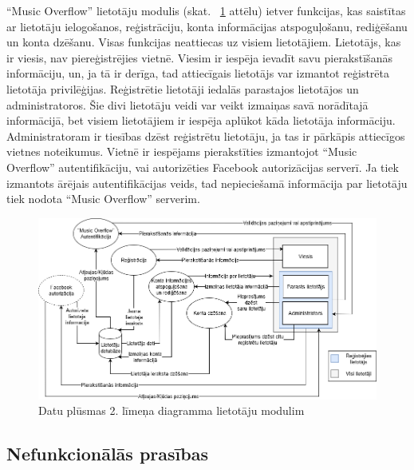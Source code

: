 \documentclass[12pt]{article}
\begin{document}
``Music Overflow'' lietotāju modulis (skat. ~\ref{fig:dpd_2_3} attēlu) ietver funkcijas, kas saistītas ar lietotāju ielogošanos, reģistrāciju, konta informācijas atspoguļošanu, rediģēšanu un konta dzēšanu. Visas funkcijas neattiecas uz visiem lietotājiem. Lietotājs, kas ir viesis, nav piereģistrējies vietnē. Viesim ir iespēja ievadīt savu pierakstīšanās informāciju, un, ja tā ir derīga, tad attiecīgais lietotājs var izmantot reģistrēta lietotāja privilēģijas. Reģistrētie lietotāji iedalās parastajos lietotājos un administratoros. Šie divi lietotāju veidi var veikt izmaiņas savā norādītajā informācijā, bet visiem lietotājiem ir iespēja aplūkot kāda lietotāja informāciju. Administratoram ir tiesības dzēst reģistrētu lietotāju, ja tas ir pārkāpis attiecīgos vietnes noteikumus. Vietnē ir iespējams pierakstīties izmantojot ``Music Overflow'' autentifikāciju, vai autorizēties Facebook autorizācijas serverī. Ja tiek izmantots ārējais autentifikācijas veids, tad nepieciešamā informācija par lietotāju tiek nodota ``Music Overflow'' serverim.

\begin{figure}[H]
\begin{center}
	\includegraphics[scale=0.4]{DPD2_3.png}
	\caption{Datu plūsmas 2. līmeņa diagramma lietotāju modulim}
	\label{fig:dpd_2_3}
\end{center}
\end{figure}

\subsection{Nefunkcionālās prasības}
\end{document}
